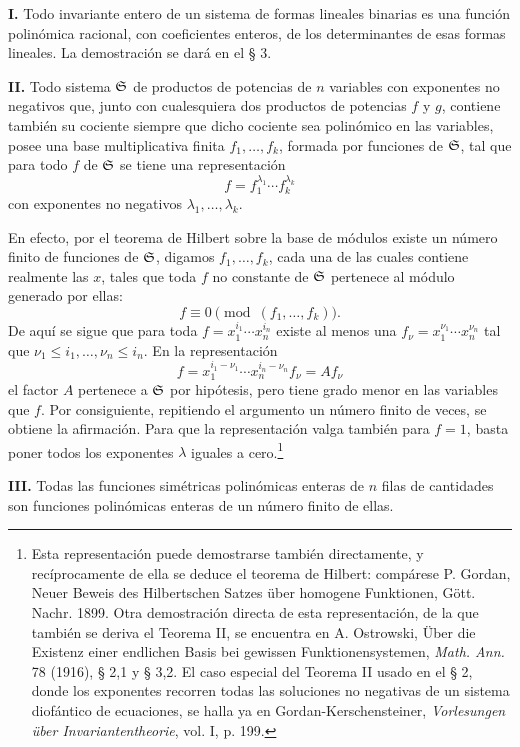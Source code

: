 \textbf{I.} Todo invariante entero de un sistema de formas lineales binarias es una función polinómica racional, con coeficientes enteros, de los determinantes de esas formas lineales. La demostración se dará en el § 3.

\textbf{II.} Todo sistema \(\mathfrak S\) de productos de potencias de \(n\) variables con exponentes no negativos que, junto con cualesquiera dos productos de potencias \(f\) y \(g\), contiene también su cociente siempre que dicho cociente sea polinómico en las variables, posee una base multiplicativa finita \(f_1,\ldots,f_k\), formada por funciones de \(\mathfrak S\), tal que para todo \(f\) de \(\mathfrak S\) se tiene una representación
\[
        f=f_1^{\lambda_1}\cdots f_k^{\lambda_k}
\]
con exponentes no negativos \(\lambda_1,\ldots,\lambda_k\).

En efecto, por el teorema de Hilbert sobre la base de módulos existe un número finito de funciones de \(\mathfrak S\), digamos \(f_1,\ldots,f_k\), cada una de las cuales contiene realmente las \(x\), tales que toda \(f\) no constante de \(\mathfrak S\) pertenece al módulo generado por ellas:
\[
        f\equiv0\pmod{(f_1,\ldots,f_k)}.
\]
De aquí se sigue que para toda \(f=x_1^{i_1}\cdots x_n^{i_n}\) existe al menos una \(f_\nu=x_1^{\nu_1}\cdots x_n^{\nu_n}\) tal que \(\nu_1\le i_1,\ldots,\nu_n\le i_n\). En la representación
\[
        f=x_1^{i_1-\nu_1}\cdots x_n^{i_n-\nu_n} f_\nu = A f_\nu
\]
el factor \(A\) pertenece a \(\mathfrak S\) por hipótesis, pero tiene grado menor en las variables que \(f\). Por consiguiente, repitiendo el argumento un número finito de veces, se obtiene la afirmación. Para que la representación valga también para \(f=1\), basta poner todos los exponentes \(\lambda\) iguales a cero.\footnote{Esta representación puede demostrarse también directamente, y recíprocamente de ella se deduce el teorema de Hilbert: compárese P. Gordan, Neuer Beweis des Hilbertschen Satzes über homogene Funktionen, Gött. Nachr. 1899. Otra demostración directa de esta representación, de la que también se deriva el Teorema II, se encuentra en A. Ostrowski, Über die Existenz einer endlichen Basis bei gewissen Funktionensystemen, \emph{Math. Ann.} 78 (1916), § 2,1 y § 3,2. El caso especial del Teorema II usado en el § 2, donde los exponentes recorren todas las soluciones no negativas de un sistema diofántico de ecuaciones, se halla ya en Gordan-Kerschensteiner, \emph{Vorlesungen über Invariantentheorie}, vol. I, p. 199.}

\textbf{III.} Todas las funciones simétricas polinómicas enteras de \(n\) filas de cantidades son funciones polinómicas enteras de un número finito de ellas.

